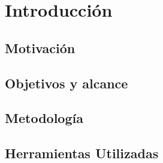\chapter{Introducción}

\section{Motivación}

\section{Objetivos y alcance}

\section{Metodología}

\section{Herramientas Utilizadas}
